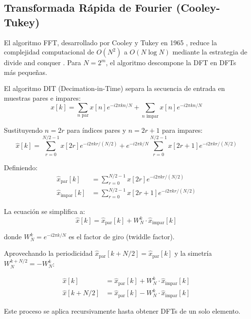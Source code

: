 \documentclass[a4paper]{article}
\begin{document}
\subsection{Transformada Rápida de Fourier (Cooley-Tukey)}

El algoritmo FFT, desarrollado por Cooley y Tukey en 1965 \cite{cooley1965algorithm}, reduce la complejidad computacional de $O(N^2)$ a $O(N \log N)$
mediante la estrategia de divide and conquer \cite{brigham1988fast}. Para $N = 2^m$, el algoritmo descompone la DFT en DFTs más pequeñas.

El algoritmo DIT (Decimation-in-Time) separa la secuencia de entrada en muestras pares e impares:
\begin{equation}
    \hat{x}[k] = \sum_{n \text{ par}} x[n] e^{-i2\pi kn/N} + \sum_{n \text{ impar}} x[n] e^{-i2\pi kn/N}
\end{equation}

Sustituyendo $n = 2r$ para índices pares y $n = 2r+1$ para impares:
\begin{equation}
    \hat{x}[k] = \sum_{r=0}^{N/2-1} x[2r] e^{-i2\pi kr/(N/2)} + e^{-i2\pi k/N} \sum_{r=0}^{N/2-1} x[2r+1] e^{-i2\pi kr/(N/2)}
\end{equation}

Definiendo:
\begin{align}
    \hat{x}_{\text{par}}[k]   & = \sum_{r=0}^{N/2-1} x[2r] e^{-i2\pi kr/(N/2)}   \\
    \hat{x}_{\text{impar}}[k] & = \sum_{r=0}^{N/2-1} x[2r+1] e^{-i2\pi kr/(N/2)}
\end{align}

La ecuación se simplifica a:
\begin{equation}
    \hat{x}[k] = \hat{x}_{\text{par}}[k] + W_N^k \cdot \hat{x}_{\text{impar}}[k]
\end{equation}

donde $W_N^k = e^{-i2\pi k/N}$ es el factor de giro (twiddle factor).

Aprovechando la periodicidad $\hat{x}_{\text{par}}[k + N/2] = \hat{x}_{\text{par}}[k]$ y la simetría $W_N^{k+N/2} = -W_N^k$:

\begin{align}
    \hat{x}[k]       & = \hat{x}_{\text{par}}[k] + W_N^k \cdot \hat{x}_{\text{impar}}[k] \\
    \hat{x}[k + N/2] & = \hat{x}_{\text{par}}[k] - W_N^k \cdot \hat{x}_{\text{impar}}[k]
\end{align}

Este proceso se aplica recursivamente hasta obtener DFTs de un solo elemento.
\end{document}
